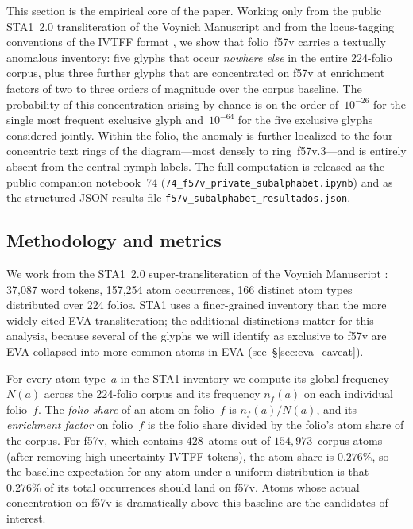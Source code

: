 This section is the empirical core of the paper. Working only from the
public STA1~2.0 transliteration of the Voynich Manuscript and from the
locus-tagging conventions of the IVTFF format \citep{zandbergen_sta1,zandbergen_ivtff},
we show that folio~f57v carries a textually anomalous inventory: five glyphs
that occur \emph{nowhere else} in the entire 224-folio corpus, plus three
further glyphs that are concentrated on f57v at enrichment factors of two to
three orders of magnitude over the corpus baseline. The probability of this
concentration arising by chance is on the order of~$10^{-26}$ for the single
most frequent exclusive glyph and~$10^{-64}$ for the five exclusive glyphs
considered jointly. Within the folio, the anomaly is further localized to the
four concentric text rings of the diagram---most densely to ring~f57v.3---and
is entirely absent from the central nymph labels. The full computation is
released as the public companion notebook~74
(\texttt{74\_f57v\_private\_subalphabet.ipynb}) and as the structured JSON
results file \texttt{f57v\_subalphabet\_resultados.json}.

\subsection{Methodology and metrics}
\label{sec:method}

We work from the STA1~2.0 super-transliteration of the Voynich Manuscript
\citep{zandbergen_sta1}: 37,087 word tokens, 157,254 atom occurrences, 166
distinct atom types distributed over 224 folios. STA1 uses a finer-grained
inventory than the more widely cited EVA transliteration; the additional
distinctions matter for this analysis, because several of the glyphs we will
identify as exclusive to f57v are EVA-collapsed into more common atoms in EVA
(see~\S\ref{sec:eva_caveat}).

For every atom type~$a$ in the STA1 inventory we compute its global frequency
$N(a)$ across the 224-folio corpus and its frequency $n_{f}(a)$ on each
individual folio~$f$. The \emph{folio share} of an atom on folio~$f$ is
$n_{f}(a)/N(a)$, and its \emph{enrichment factor} on folio~$f$ is the folio
share divided by the folio's atom share of the corpus. For f57v, which
contains $428$~atoms out of $154{,}973$~corpus atoms (after removing
high-uncertainty IVTFF tokens), the atom share is $0.276\%$, so the baseline
expectation for any atom under a uniform distribution is that $0.276\%$ of its
total occurrences should land on f57v. Atoms whose actual concentration on
f57v is dramatically above this baseline are the candidates of interest.

